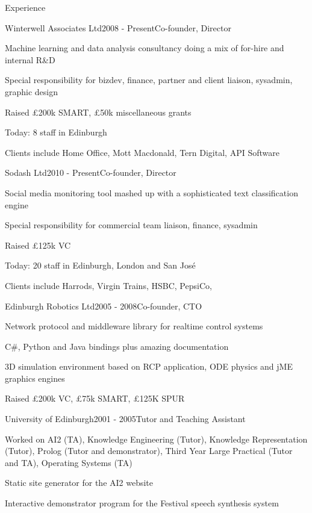 \documentclass{resume} %
\begin{document}
\begin{rSection}{Experience}

\begin{rSubsection}{Winterwell Associates Ltd}{2008 - Present}{Co-founder, Director}{}
\item Machine learning and data analysis consultancy doing a mix of for-hire and internal R\&D
\item Special responsibility for bizdev, finance, partner and client liaison, sysadmin, graphic design
\item Raised £200k SMART, £50k miscellaneous grants
\item Today: 8 staff in Edinburgh
\item Clients include Home Office, Mott Macdonald, Tern Digital, API Software
\end{rSubsection}


\begin{rSubsection}{Sodash Ltd}{2010 - Present}{Co-founder, Director}{}
\item Social media monitoring tool mashed up with a sophisticated text classification engine
\item Special responsibility for commercial team liaison, finance, sysadmin
\item Raised £125k VC
\item Today: 20 staff in Edinburgh, London and San José
\item Clients include Harrods, Virgin Trains, HSBC, PepsiCo, 
\end{rSubsection}


\begin{rSubsection}{Edinburgh Robotics Ltd}{2005 - 2008}{Co-founder, CTO}{}
\item Network protocol and middleware library for realtime control systems
\item C\#, Python and Java bindings plus amazing documentation
\item 3D simulation environment based on RCP application, ODE physics and jME graphics engines
\item Raised £200k VC, £75k SMART, £125K SPUR
\end{rSubsection}

\begin{rSubsection}{University of Edinburgh}{2001 - 2005}{Tutor and Teaching Assistant}{}
\item Worked on AI2 (TA), Knowledge Engineering (Tutor), Knowledge Representation (Tutor), Prolog (Tutor and demonstrator), Third Year Large Practical (Tutor and TA), Operating Systems (TA)
\item Static site generator for the AI2 website
\item Interactive demonstrator program for the Festival speech synthesis system
\end{rSubsection}

\end{rSection}
\end{document}
